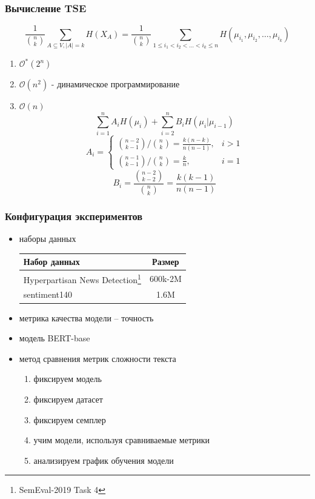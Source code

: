 \documentclass{beamer}
\begin{document}
\begin{frame}
	\frametitle{Вычисление TSE}
		\[
			\frac{1}{\binom{n}{k}}\sum\limits_{A\subseteq V,|A|=k}H(X_A) =
			\frac{1}{\binom{n}{k}}\sum\limits_{1 \le i_1 < i_2 < \ldots < i_k \le n}H(\mu_{i_1}, \mu_{i_2}, \ldots, \mu_{i_k})
		\]
		\begin{enumerate}
			\item $\mathcal{O^*}(2^n)$
			\item $\mathcal{O}(n^2)$ - динамическое программирование
			\item $\mathcal{O}(n)$
				\[
					\sum\limits_{i=1}^{n}A_iH(\mu_i) + \sum\limits_{i=2}^{n}B_iH(\mu_i|\mu_{i-1})
				\]
				\[
					A_i = 
					\begin{cases}
						\binom{n-2}{k-1}/\binom{n}{k}=\frac{k(n-k)}{n(n-1)},& i > 1 \\
						\binom{n-1}{k-1}/\binom{n}{k}=\frac k n,& i = 1
					\end{cases}
				\]
				\[
					B_i = \frac{\binom{n-2}{k-2}}{\binom{n}{k}} = \frac{k(k-1)}{n(n-1)}
				\]
		\end{enumerate}
\end{frame}

\begin{frame}
	\frametitle{Конфигурация экспериментов}
	\begin{itemize}
		\item наборы данных
		\begin{table}
			\begin{tabular}{l|c}
				Набор данных & Размер \\
				\hline\hline
				Hyperpartisan News Detection\footnote[1]{SemEval-2019 Task 4} & 600k-2M \\
				sentiment140 & 1.6M \\
			\end{tabular}
		\end{table}
		\item метрика качества модели -- точность
		\item модель BERT-base
		\item метод сравнения метрик сложности текста
			\begin{enumerate}
				\item фиксируем модель
				\item фиксируем датасет
				\item фиксируем семплер
				\item учим модели, используя сравниваемые метрики
				\item анализируем график обучения модели
			\end{enumerate}
	\end{itemize}
\end{frame}
\end{document}

